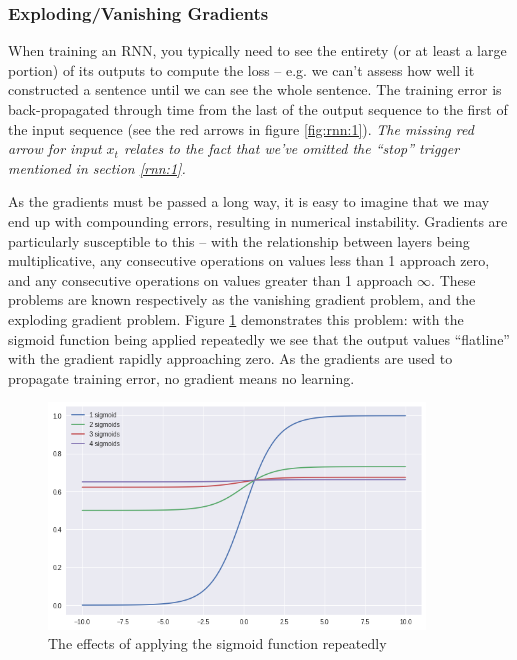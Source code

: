 \documentclass{report}
\begin{document}
\subsubsection{Exploding/Vanishing Gradients}
When training an RNN, you typically need to see the entirety (or at least a large portion) of its outputs to compute the loss -- e.g. we can't assess how well it constructed a sentence until we can see the whole sentence. The training error is back-propagated through time from the last of the output sequence to the first of the input sequence (see the red arrows in figure \ref{fig:rnn:1}). \textit{The missing red arrow for input $x_t$ relates to the fact that we've omitted the ``stop'' trigger mentioned in section \ref{rnn:1}.} \par
As the gradients must be passed a long way, it is easy to imagine that we may end up with compounding errors, resulting in numerical instability. Gradients are particularly susceptible to this -- with the relationship between layers being multiplicative, any consecutive operations on values less than 1 approach zero, and any consecutive operations on values greater than 1 approach $\infty$. These problems are known respectively as the vanishing gradient problem, and the exploding gradient problem. Figure \ref{fig:multi-sigmoids:1} demonstrates this problem: with the sigmoid function being applied repeatedly we see that the output values ``flatline'' with the gradient rapidly approaching zero. As the gradients are used to propagate training error, no gradient means no learning.
\begin{figure}[h]
 \centering
 \includegraphics[width=10cm]{multi-sigmoids}
 \caption{The effects of applying the sigmoid function repeatedly}
 \label{fig:multi-sigmoids:1}
\end{figure}
\end{document}

